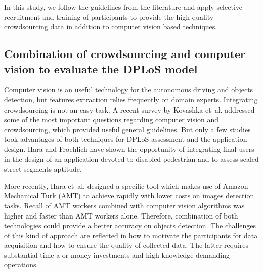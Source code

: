 \documentclass[10pt,conference,a4paper]{IEEEtran}
\begin{document}



In this study, we follow the guidelines from the literature and apply selective recruitment and training of participants to provide the high-quality crowdsourcing data in addition to computer vision based techniques.

\subsection{Combination of crowdsourcing and computer vision to evaluate the DPLoS model}
Computer vision is an useful technology for the autonomous driving and objects detection, but features extraction relies frequently on domain experts. Integrating crowdsourcing is not an easy task. A recent survey by Kovashka et~al. \cite{kovashka2016crowdsourcing} addressed some of the most important questions regarding computer vision and crowdsourcing, which provided useful general guidelines. But only a few studies took advantages of both techniques for DPLoS assessment and the application design.
Hara and Froehlich \cite{hara_feasibility_2012}
have shown the opportunity of integrating final users in the design of an application devoted to disabled pedestrian and to assess scaled street segments aptitude.

More recently, Hara et~al. \cite{hara_tohme:_2014,hara_characterizing_2015} designed a specific tool which makes use of Amazon Mechanical Turk (AMT) to achieve rapidly with lower costs on images detection tasks. Recall of AMT workers combined with computer vision algorithms was higher and faster than AMT workers alone. Therefore, combination of both technologies could provide a better accuracy on objects detection. The challenges of this kind of approach are reflected in how to motivate the participants for data acquisition and how to ensure the quality of collected data. The latter requires substantial time a or money investments and high knowledge demanding operations.
\end{document}
